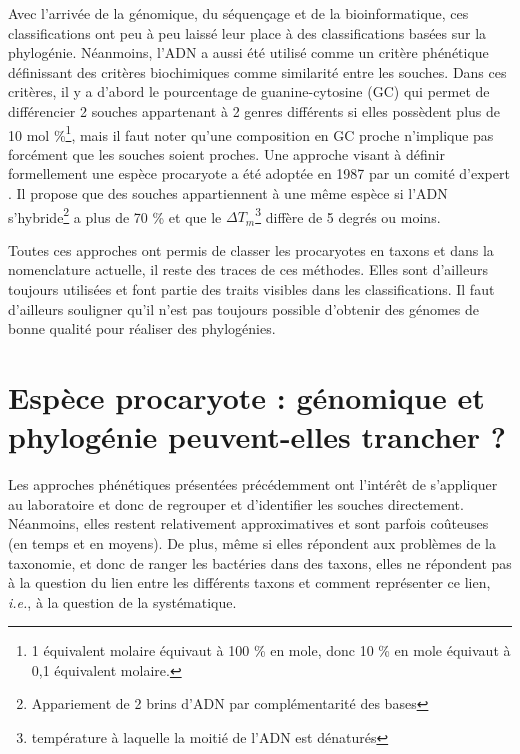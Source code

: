 Avec l'arrivée de la génomique, du séquençage et de la bioinformatique, ces classifications ont peu à peu laissé leur place à des classifications basées sur la phylogénie. Néanmoins, l'ADN a aussi été utilisé comme un critère phénétique définissant des critères biochimiques comme similarité entre les souches. 
Dans ces critères, il y a d'abord le pourcentage de guanine-cytosine (GC) qui permet de différencier 2 souches appartenant à 2 genres différents si elles possèdent plus de 10 mol \%\footnote{1 équivalent molaire équivaut à 100 \% en mole, donc 10 \% en mole équivaut à 0,1 équivalent molaire.}, mais il faut noter qu'une composition en GC proche n'implique pas forcément que les souches soient proches. 
Une approche visant à définir formellement une espèce procaryote a été adoptée en 1987 par un comité d'expert \cite{moore_report_1987}. Il propose que des souches appartiennent à une même espèce si l'ADN s'hybride\footnote{Appariement de 2 brins d'ADN par complémentarité des bases} a plus de 70 \% et que le $\Delta T_m$\footnote{température à laquelle la moitié de l'ADN est dénaturés} diffère de 5 degrés ou moins.

Toutes ces approches ont permis de classer les procaryotes en taxons et dans la nomenclature actuelle, il reste des traces de ces méthodes. Elles sont d'ailleurs toujours utilisées et font partie des traits visibles dans les classifications. Il faut d'ailleurs souligner qu'il n'est pas toujours possible d'obtenir des génomes de bonne qualité pour réaliser des phylogénies.

\section{Espèce procaryote : génomique et phylogénie peuvent-elles trancher ?}

Les approches phénétiques présentées précédemment ont l'intérêt de s'appliquer au laboratoire et donc de regrouper et d'identifier les souches directement. Néanmoins, elles restent relativement approximatives et sont parfois coûteuses (en temps et en moyens). De plus, même si elles répondent aux problèmes de la taxonomie, et donc de ranger les bactéries dans des taxons, elles ne répondent pas à la question du lien entre les différents taxons et comment représenter ce lien, \textit{i.e.}, à la question de la systématique. 

